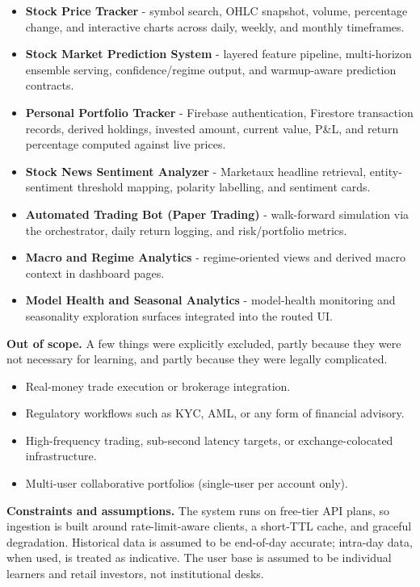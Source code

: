 \documentclass[12pt,a4paper]{report}
\numberwithin{equation}{chapter}
\begin{document}
\begin{itemize}
  \item \textbf{Stock Price Tracker} - symbol search, OHLC snapshot, volume, percentage change, and interactive charts across daily, weekly, and monthly timeframes.
  \item \textbf{Stock Market Prediction System} - layered feature pipeline, multi-horizon ensemble serving, confidence/regime output, and warmup-aware prediction contracts.
  \item \textbf{Personal Portfolio Tracker} - Firebase authentication, Firestore transaction records, derived holdings, invested amount, current value, P\&L, and return percentage computed against live prices.
  \item \textbf{Stock News Sentiment Analyzer} - Marketaux headline retrieval, entity-sentiment threshold mapping, polarity labelling, and sentiment cards.
  \item \textbf{Automated Trading Bot (Paper Trading)} - walk-forward simulation via the orchestrator, daily return logging, and risk/portfolio metrics.
  \item \textbf{Macro and Regime Analytics} - regime-oriented views and derived macro context in dashboard pages.
  \item \textbf{Model Health and Seasonal Analytics} - model-health monitoring and seasonality exploration surfaces integrated into the routed UI.
\end{itemize}

\textbf{Out of scope.} A few things were explicitly excluded, partly because they were not necessary for learning, and partly because they were legally complicated.

\begin{itemize}
  \item Real-money trade execution or brokerage integration.
  \item Regulatory workflows such as KYC, AML, or any form of financial advisory.
  \item High-frequency trading, sub-second latency targets, or exchange-colocated infrastructure.
  \item Multi-user collaborative portfolios (single-user per account only).
\end{itemize}

\textbf{Constraints and assumptions.} The system runs on free-tier API plans, so ingestion is built around rate-limit-aware clients, a short-TTL cache, and graceful degradation. Historical data is assumed to be end-of-day accurate; intra-day data, when used, is treated as indicative. The user base is assumed to be individual learners and retail investors, not institutional desks.
\end{document}
